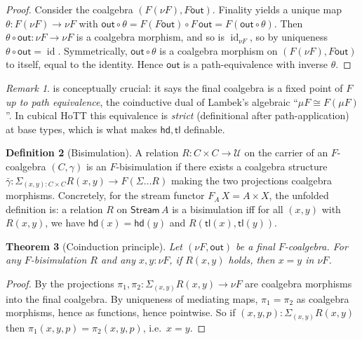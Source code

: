\documentclass[12pt]{article}
\newtheorem{theorem}{Theorem}[section]
\theoremstyle{definition}
\newtheorem{definition}[theorem]{Definition}
\theoremstyle{remark}
\newtheorem{remark}[theorem]{Remark}
\newcommand{\Type}{\mathcal{U}}
\newcommand{\Stream}{\mathsf{Stream}}
\newcommand{\hd}{\mathsf{hd}}
\newcommand{\tl}{\mathsf{tl}}
\newcommand{\out}{\mathsf{out}}
\DeclareMathOperator{\id}{id}
\begin{document}
\begin{proof}
Consider the coalgebra $(F(\nu F), F\out)$. Finality yields a
unique map $\theta: F(\nu F) \to \nu F$ with
$\out \circ \theta = F(F\out) \circ F\,\out = F(\out \circ \theta)$.
Then $\theta \circ \out: \nu F \to \nu F$ is a coalgebra morphism,
and so is $\id_{\nu F}$, so by uniqueness $\theta\circ\out = \id$.
Symmetrically, $\out \circ \theta$ is a coalgebra morphism on
$(F(\nu F), F\out)$ to itself, equal to the identity. Hence
$\out$ is a path-equivalence with inverse $\theta$.
\end{proof}

\begin{remark}
 is conceptually crucial: it says the
final coalgebra is a fixed point of $F$ \emph{up to path
equivalence}, the coinductive dual of Lambek's algebraic
``$\mu F \cong F(\mu F)$''. In cubical HoTT this equivalence is
\emph{strict} (definitional after path-application) at base types,
which is what makes $\hd, \tl$ definable.
\end{remark}

\begin{definition}[Bisimulation]\label{def:bisim}
A relation $R: C \times C \to \Type$ on the carrier of an
$F$-coalgebra $(C,\gamma)$ is an $F$-bisimulation if there exists
a coalgebra structure
$\bar\gamma: \Sigma_{(x,y):C\times C}R(x,y) \to F(\Sigma\dots R)$
making the two projections coalgebra morphisms. Concretely, for
the stream functor $F_A\,X = A \times X$, the unfolded definition
is: a relation $R$ on $\Stream\,A$ is a bisimulation iff for all
$(x,y)$ with $R(x,y)$, we have $\hd(x) = \hd(y)$ and
$R(\tl(x), \tl(y))$.
\end{definition}

\begin{theorem}[Coinduction principle]\label{thm:coinduction}
Let $(\nu F, \out)$ be a final $F$-coalgebra. For any
$F$-bisimulation $R$ and any $x, y: \nu F$, if $R(x,y)$ holds,
then $x = y$ in $\nu F$.
\end{theorem}

\begin{proof}
By  the projections
$\pi_1, \pi_2: \Sigma_{(x,y)}R(x,y) \to \nu F$ are coalgebra
morphisms into the final coalgebra. By uniqueness of mediating
maps, $\pi_1 = \pi_2$ as coalgebra morphisms, hence as
functions, hence pointwise. So if $(x,y,p):\Sigma_{(x,y)}R(x,y)$
then $\pi_1(x,y,p) = \pi_2(x,y,p)$, i.e.\ $x = y$.
\end{proof}
\end{document}
